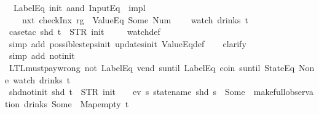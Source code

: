 \begin{isabellebody}
{\ \ {\isachardoublequoteopen}{\isacharparenleft}{\isacharparenleft}LabelEq\ {\isacharprime}{\isacharprime}init{\isacharprime}{\isacharprime}\ aand\ InputEq\ {\isacharbrackleft}{\isacharbrackright}{\isacharparenright}\ impl\isanewline
\ \ \ \ {\isacharparenleft}nxt\ {\isacharparenleft}checkInx\ rg\ {}\ ValueEq\ {\isacharparenleft}Some\ {\isacharparenleft}Num\ {}{\isacharparenright}{\isacharparenright}{\isacharparenright}{\isacharparenright}{\isacharparenright}\isanewline
\ \ \ {\isacharparenleft}watch\ drinks\ t{\isacharparenright}{\isachardoublequoteclose}%
}%
%
\isadelimproof
\ \ %
\endisadelimproof
%
\isatagproof
{}\isamarkupfalse%
\ {\isacharparenleft}case{\isacharunderscore}tac\ {\isachardoublequoteopen}shd\ t\ {\isacharequal}\ {\isacharparenleft}STR\ {\isacharprime}{\isacharprime}init{\isacharprime}{\isacharprime}{\isacharcomma}\ {\isacharbrackleft}{\isacharbrackright}{\isacharparenright}{\isachardoublequoteclose}{\isacharparenright}\isanewline
\ \ \isamarkupfalse%
\ watch{\isacharunderscore}def\isanewline
\ \ \ \isamarkupfalse%
\ {\isacharparenleft}simp\ add{\isacharcolon}\ possible{\isacharunderscore}steps{\isacharunderscore}init\ updates{\isacharunderscore}init\ ValueEq{\isacharunderscore}def{\isacharparenright}\isanewline
\ \ \isamarkupfalse%
\ clarify\isanewline
\ \ \isamarkupfalse%
\ {\isacharparenleft}simp\ add{\isacharcolon}\ not{\isacharunderscore}init{\isacharparenright}%
\endisatagproof
{\isafoldproof}%
%
\isadelimproof
%
\endisadelimproof
\isanewline
\isanewline
\isanewline
{}\isamarkupfalse%
\ LTL{\isacharunderscore}must{\isacharunderscore}pay{\isacharunderscore}wrong{\isacharcolon}\ {\isachardoublequoteopen}{\isacharparenleft}{\isacharparenleft}not\ {\isacharparenleft}LabelEq\ {\isacharprime}{\isacharprime}vend{\isacharprime}{\isacharprime}\ suntil\ LabelEq\ {\isacharprime}{\isacharprime}coin{\isacharprime}{\isacharprime}{\isacharparenright}{\isacharparenright}\ suntil\ StateEq\ None{\isacharparenright}\ {\isacharparenleft}watch\ drinks\ t{\isacharparenright}{\isachardoublequoteclose}\isanewline
%
\isadelimproof
\ \ %
\endisadelimproof
%
\isatagproof
{}\isamarkupfalse%
%
\endisatagproof
{\isafoldproof}%
%
\isadelimproof
\isanewline
%
\endisadelimproof
\isanewline
{}\isamarkupfalse%
\ shd{\isacharunderscore}not{\isacharunderscore}init{\isacharcolon}\ {\isachardoublequoteopen}shd\ t\ {\isasymnoteq}\ {\isacharparenleft}STR\ {\isacharprime}{\isacharprime}init{\isacharprime}{\isacharprime}{\isacharcomma}\ {\isacharbrackleft}{\isacharbrackright}{\isacharparenright}\ {\isasymLongrightarrow}\ {\isasymnot}\ ev\ {\isacharparenleft}{\isasymlambda}s{\isachardot}\ statename\ {\isacharparenleft}shd\ s{\isacharparenright}\ {\isacharequal}\ Some\ {}{\isacharparenright}\ {\isacharparenleft}make{\isacharunderscore}full{\isacharunderscore}observation\ drinks\ {\isacharparenleft}Some\ {}{\isacharparenright}\ Map{\isachardot}empty\ t{\isacharparenright}{\isachardoublequoteclose}\isanewline

\end{isabellebody}
